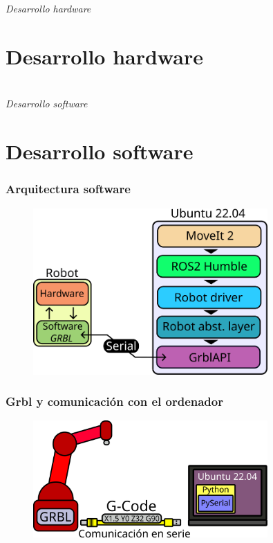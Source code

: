 \documentclass{beamer}
\begin{document}
\section*{}
\begin{frame}{}
  \centering \Huge
  \emph{Desarrollo hardware}
\end{frame}
\section{Desarrollo hardware}

\section*{}
\begin{frame}{}
  \centering \Huge
  \emph{Desarrollo software}
\end{frame}
\section{Desarrollo software}

\begin{frame}
  \frametitle{Arquitectura software}
  \begin{figure}[h]
    \centering
    \includegraphics[width=0.8\textwidth]{figs/arquitectura_sw.png}
  \end{figure}
  \end{frame}

\begin{frame}
\frametitle{Grbl y comunicación con el ordenador}
\begin{figure}[h]
  \centering
  \includegraphics[width=0.8\textwidth]{figs/coms.png}
\end{figure}
\end{frame}
\end{document}
